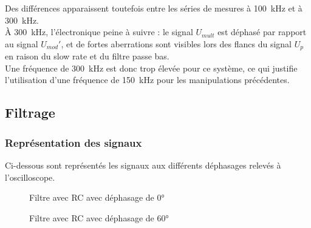 Des différences apparaissent toutefois entre les séries de mesures à 100~kHz et à 300~kHz. \\  
À 300~kHz, l’électronique peine à suivre : le signal \( U_{mult} \) est déphasé par rapport au signal \( U_{mod}' \),  
et de fortes aberrations sont visibles lors des flancs du signal \( U_{p} \) en raison du slow rate et 
du filtre passe bas. \\  
Une fréquence de 300~kHz est donc trop élevée pour ce système, ce qui justifie  
l’utilisation d’une fréquence de 150~kHz pour les manipulations précédentes.


\subsection{Filtrage}

\subsubsection{Représentation des signaux}

Ci-dessous sont représentés les signaux aux différents déphasages relevés à l'oscilloscope. 

\begin{figure}[H]
    \begin{minipage}[c]{.50\linewidth}
        \centering
        \caption{Filtre avec RC avec déphasage de 0° }
    \label{fig:f1}
    \end{minipage}
    \hfill%
    \begin{minipage}[c]{.50\linewidth}
        \centering
       \caption{Filtre avec RC avec déphasage de 60°}
 \label{fig:f2}
    \end{minipage}
\end{figure}

